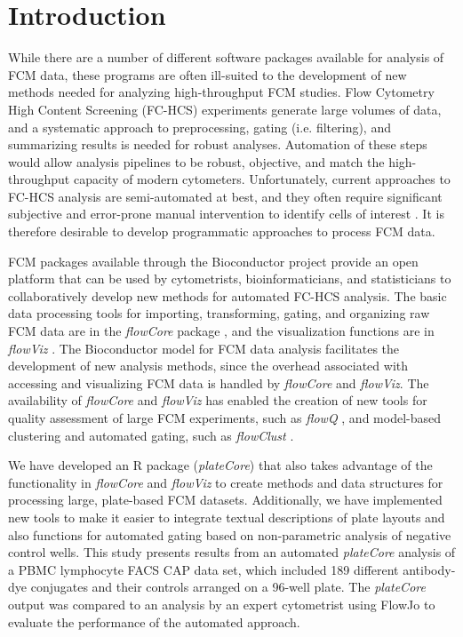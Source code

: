 \documentclass[12pt]{article}
\newcommand{\Rpackage}[1]{{\textit{#1}}}
\begin{document}
\clearpage
\section*{Introduction}

While there are a number of different software packages available for analysis
of FCM data, these programs are often ill-suited to the development of new
methods needed for analyzing high-throughput FCM studies. Flow Cytometry High
Content Screening (FC-HCS) experiments generate large volumes of data, and a
systematic approach to preprocessing, gating (i.e. filtering), and summarizing
results is needed for robust analyses. Automation of these steps would allow
analysis pipelines to be robust, objective, and match the high-throughput
capacity of modern cytometers. Unfortunately, current approaches to FC-HCS
analysis are semi-automated at best, and they often require significant
subjective and error-prone manual intervention to identify cells of interest
\citep{Maecker2005}. It is therefore desirable to develop programmatic
approaches to process FCM data.

FCM packages available through the Bioconductor \citep{BIOC} project provide an
open platform that can be used by cytometrists, bioinformaticians, and
statisticians to collaboratively develop new methods for automated FC-HCS
analysis. The basic data processing tools for importing, transforming, gating,
and organizing raw FCM data are in the \Rpackage{flowCore} package
\citep{hahne2009}, and the visualization functions are in \Rpackage{flowViz}
\citep{sarkar2008ufv}. The Bioconductor model for FCM data analysis facilitates
the development of new analysis methods, since the overhead associated with
accessing and visualizing FCM data is handled by \Rpackage{flowCore} and
\Rpackage{flowViz}. The availability of \Rpackage{flowCore} and
\Rpackage{flowViz} has enabled the creation of new tools for quality assessment
of large FCM experiments, such as \Rpackage{flowQ} \citep{lemeurFQ}, and
model-based clustering and automated gating, such as \Rpackage{flowClust}
\citep{lo2008}.

We have developed an R package (\Rpackage{plateCore}) that also takes advantage
of the functionality in \Rpackage{flowCore} and \Rpackage{flowViz} to create
methods and data structures for processing large, plate-based FCM datasets.
Additionally, we have implemented new tools to make it easier to integrate
textual descriptions of plate layouts and also functions for automated gating
based on non-parametric analysis of negative control wells. This study presents
results from an automated \Rpackage{plateCore} analysis of a PBMC lymphocyte
FACS CAP data set, which included 189 different antibody-dye conjugates
and their controls arranged on a 96-well plate. The \Rpackage{plateCore} output
was compared to an analysis by an expert cytometrist using FlowJo to evaluate
the performance of the automated approach.
\end{document}
